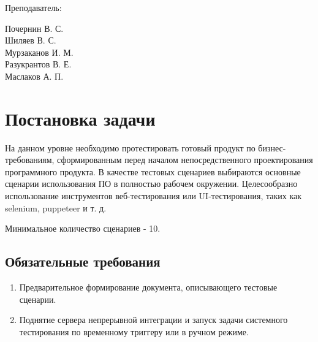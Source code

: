 \documentclass[a4paper, 14pt]{article}
\begin{document}
\begin{titlepage}
\begin{multicols}{2}
\begin{flushright}
            {Преподаватель:\\}

        \end{flushright}
        \begin{flushright}

            {Почернин В. С.}\\
            {Шиляев В. С.}\\
            {Мурзаканов И. М.}\\
            {Разукрантов В. Е.}\\[0.5cm]


            Маслаков А. П.\\

        \end{flushright}
    \end{multicols}

    \flushright{
        {\phantom{qwe}}\\[0.5cm]
    }

    \vfill
\end{titlepage}

\Large
\tableofcontents
\newpage
\large

\section{Постановка задачи}

На данном уровне необходимо протестировать готовый продукт по 
бизнес-требованиям, сформированным перед началом непосредственного 
проектирования программного продукта. В качестве тестовых сценариев 
выбираются основные сценарии использования ПО в полностью рабочем 
окружении. Целесообразно использование инструментов веб-тестирования 
или UI-тестирования, таких как selenium, puppeteer и т. д.

Минимальное количество сценариев - 10.

\subsection{Обязательные требования}

\begin{enumerate}
    \item Предварительное формирование документа, описывающего тестовые сценарии.
    \item Поднятие сервера непрерывной интеграции и запуск задачи системного тестирования по временному триггеру или в ручном режиме.
\end{enumerate}
\end{document}
